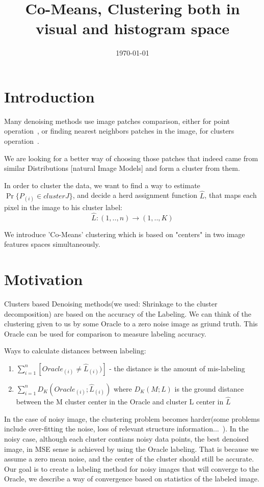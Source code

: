 \documentclass{article}
\title{Co-Means, Clustering both in visual and histogram space}
\author{}
\date{\today}
\begin{document}
\maketitle

\section{Introduction}
Many denoising methods use image patches comparison, either for point operation~\cite{BM3Dipol}, or finding nearest neighbors patches in the image, for clusters operation~\cite{nonlocalmeans}.

We are looking for a better way of choosing those patches that indeed came from similar Distributions [natural Image Models] and form a cluster from them.

In order to cluster the data, we want to find a way to estimate $ \Pr\{P_{(i)}\in cluster J \}$, and decide a herd assignment function $ \hat{L} $, that maps each pixel in the image to his cluster label:
\begin{equation}
\hat L :(1,..,n)\rightarrow (1,..,K)
\end{equation}

We introduce 'Co-Means' clustering which is based on "centers" in two image features spaces simultaneously.


\section{Motivation}
Clusters based Denoising methods(we used: Shrinkage to the  cluster decomposition) are based on the accuracy of the Labeling.
We can think of the clustering given to us by some Oracle to a zero noise image as griund truth. This Oracle can be used for comparison to measure labeling accuracy. 


Ways to calculate distances between labeling:
\begin{enumerate}
	\item $ \sum_{i=1}^{n} [Oracle_{(i)}\ne\hat{L}_{(i)})]$  - the distance is the amount of mis-labeling
	\item $ \sum_{i=1}^{n} D_K(Oracle_{(i)};\hat{L}_{(i)}) $ where $ D_K(M;L) $ is the ground distance between the M cluster center in the Oracle and cluster L center in $ \hat{L} $
\end{enumerate}

In the case of noisy image, the clustering problem becomes harder(some problems include over-fitting the noise, loss of relevant structure information...~\cite{IraniInterExt}). In the noisy case, although each cluster contians noisy data points, the best denoised image, in MSE sense is achieved by using the Oracle labeling. That is because we assume a zero mean noise, and the center of the cluster should still be accurate.
Our goal is to create a labeling method for noisy images that will converge to the Oracle, we describe a way of convergence based on statistics of the labeled image.
\end{document}
